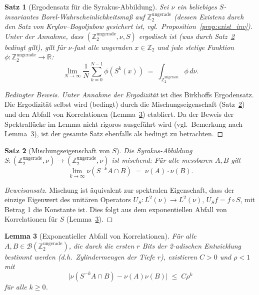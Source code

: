\documentclass[12pt,a4paper]{article}
\newtheorem{theorem}{Satz}[section]
\newtheorem{lemma}[theorem]{Lemma}
\begin{document}
\begin{theorem}[Ergodensatz für die Syrakus-Abbildung]\label{thm:ergodensatz}
Sei $\nu$ ein beliebiges $S$-invariantes Borel-Wahrscheinlichkeitsmaß auf
$\mathbb{Z}_2^{\text{ungerade}}$ (dessen Existenz durch den Satz von
Krylov--Bogoljubow gesichert ist, vgl.\ Proposition~\ref{prop:exist_inv}).
Unter der \emph{Annahme}, dass $(\mathbb{Z}_2^{\text{ungerade}}, \nu, S)$ ergodisch
ist (was durch Satz~\ref{thm:mischung} bedingt gilt), gilt für $\nu$-fast alle
ungeraden $x \in \mathbb{Z}_2$ und jede stetige Funktion
$\phi\colon \mathbb{Z}_2^{\text{ungerade}} \to \mathbb{R}$:
\[
  \lim_{N \to \infty} \frac{1}{N} \sum_{k=0}^{N-1} \phi(S^k(x)) \;=\; \int_{\mathbb{Z}_2^{\text{ungerade}}} \phi \, d\nu.
\]
\end{theorem}

\begin{proof}[Bedingter Beweis]
\emph{Unter Annahme der Ergodizität} ist dies Birkhoffs Ergodensatz. Die Ergodizität
selbst wird (bedingt) durch die Mischungseigenschaft (Satz~\ref{thm:mischung}) und
den Abfall von Korrelationen (Lemma~\ref{lem:abfall_korr}) etabliert. Da der Beweis
der Spektrallücke im Lemma nicht rigoros ausgeführt wird (vgl.\ Bemerkung nach
Lemma~\ref{lem:abfall_korr}), ist der gesamte Satz ebenfalls als bedingt zu betrachten.
\end{proof}

\begin{theorem}[Mischungseigenschaft von $S$]\label{thm:mischung}
Die Syrakus-Abbildung $S\colon (\mathbb{Z}_2^{\text{ungerade}}, \nu) \to (\mathbb{Z}_2^{\text{ungerade}}, \nu)$
ist \emph{mischend}: Für alle messbaren $A, B$ gilt
\[
  \lim_{k \to \infty} \nu(S^{-k}A \cap B) \;=\; \nu(A) \cdot \nu(B).
\]
\end{theorem}

\begin{proof}[Beweisansatz]
Mischung ist äquivalent zur spektralen Eigenschaft, dass der einzige Eigenwert des
unitären Operators $U_S\colon L^2(\nu) \to L^2(\nu)$, $U_S f = f \circ S$, mit Betrag 1
die Konstante ist. Dies folgt aus dem exponentiellen Abfall von Korrelationen für $S$
(Lemma~\ref{lem:abfall_korr}).
\end{proof}

\begin{lemma}[Exponentieller Abfall von Korrelationen]\label{lem:abfall_korr}
Für alle $A, B \in \mathcal{B}(\mathbb{Z}_2^{\text{ungerade}})$, die durch die ersten $r$
Bits der 2-adischen Entwicklung bestimmt werden (d.h.\ Zylindermengen der Tiefe $r$),
existieren $C > 0$ und $\rho < 1$ mit
\[
  \bigl|\nu(S^{-k}A \cap B) - \nu(A)\nu(B)\bigr| \;\leq\; C \rho^k
\]
für alle $k \geq 0$.
\end{lemma}
\end{document}
